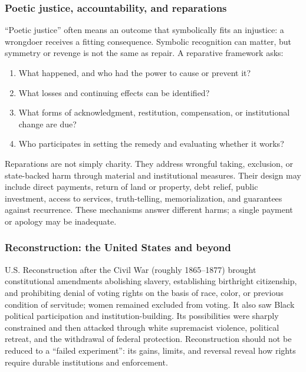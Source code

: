 \documentclass[
  11pt,
  letterpaper,
]{article}
\providecommand{\tightlist}{%
  \setlength{\itemsep}{0pt}\setlength{\parskip}{0pt}}
\begin{document}
\subsubsection{Poetic justice, accountability, and
reparations}\label{poetic-justice-accountability-and-reparations}

``Poetic justice'' often means an outcome that symbolically fits an
injustice: a wrongdoer receives a fitting consequence. Symbolic
recognition can matter, but symmetry or revenge is not the same as
repair. A reparative framework asks:

\begin{enumerate}
\def\labelenumi{\arabic{enumi}.}
\tightlist
\item
  What happened, and who had the power to cause or prevent it?
\item
  What losses and continuing effects can be identified?
\item
  What forms of acknowledgment, restitution, compensation, or
  institutional change are due?
\item
  Who participates in setting the remedy and evaluating whether it
  works?
\end{enumerate}

Reparations are not simply charity. They address wrongful taking,
exclusion, or state-backed harm through material and institutional
measures. Their design may include direct payments, return of land or
property, debt relief, public investment, access to services,
truth-telling, memorialization, and guarantees against recurrence. These
mechanisms answer different harms; a single payment or apology may be
inadequate.

\subsubsection{Reconstruction: the United States and
beyond}\label{reconstruction-the-united-states-and-beyond}

U.S. Reconstruction after the Civil War (roughly 1865--1877) brought
constitutional amendments abolishing slavery, establishing birthright
citizenship, and prohibiting denial of voting rights on the basis of
race, color, or previous condition of servitude; women remained excluded
from voting. It also saw Black political participation and
institution-building. Its possibilities were sharply constrained and
then attacked through white supremacist violence, political retreat, and
the withdrawal of federal protection. Reconstruction should not be
reduced to a ``failed experiment'': its gains, limits, and reversal
reveal how rights require durable institutions and enforcement.
\end{document}
